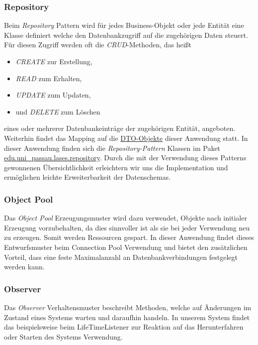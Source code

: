 \subsubsection{Repository}
Beim \emph{Repository} Pattern wird für jedes Business-Objekt oder jede Entität
eine Klasse definiert welche den Datenbankzugriff auf die zugehörigen Daten steuert.
Für diesen Zugriff werden oft die \textit{CRUD}-Methoden, das heißt
\begin{itemize}
    \item \textit{CREATE} zur Erstellung,
    \item \textit{READ} zum Erhalten,
    \item \textit{UPDATE} zum Updaten,
    \item und \textit{DELETE} zum Löschen
\end{itemize}
eines oder mehrerer Datenbankeinträge der zugehörigen Entität, angeboten.
Weiterhin findet das Mapping auf die \hyperref[arch:transport]{DTO-Objekte} dieser Anwendung statt.
In dieser Anwendung finden sich die \emph{Repository-Pattern} Klassen im Paket
\hyperref[arch:repository]{edu.uni\_passau.lases.repository}. Durch die mit
der Verwendung dieses Patterns gewonnenen Übersichtlichkeit erleichtern wir uns die
Implementation und ermöglichen leichte Erweiterbarkeit der Datenschemas.

\subsubsection{Object Pool}
Das \emph{Object Pool} Erzeugungsmuster wird dazu verwendet, Objekte nach initialer Erzeugung
vorzubehalten, da dies sinnvoller ist als sie bei jeder Verwendung neu zu erzeugen.
Somit werden Ressourcen gespart. In dieser Anwendung findet dieses Entwurfsmuster
beim Connection Pool %
Verwendung und bietet den zusätzlichen Vorteil, dass eine feste Maximalanzahl an
Datenbankverbindungen festgelegt werden kann.

\subsubsection{Observer}
Das \emph{Observer} Verhaltensmuster beschreibt Methoden, welche auf
Änderungen im Zustand eines Systems warten und daraufhin handeln.
In unserem System findet das beispielsweise beim LifeTimeListener %
zur Reaktion auf das Herunterfahren oder Starten des Systems Verwendung.
